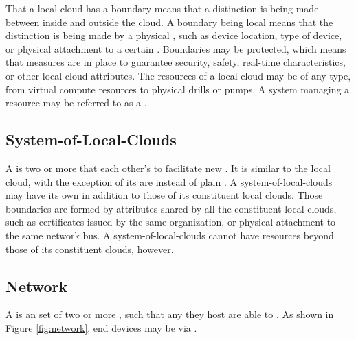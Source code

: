 That a local cloud has a boundary means that a distinction is being made between  inside and outside the cloud.
A boundary being local means that the distinction is being made by a physical , such as device location, type of device, or physical attachment to a certain .
Boundaries may be protected, which means that measures are in place to guarantee security, safety, real-time characteristics, or other local cloud attributes.
The resources of a local cloud may be of any type, from virtual compute resources to physical drills or pumps.
A system managing a resource may be referred to as a .

\subsection{System-of-Local-Clouds}
\label{sec:concepts:solc}

A  is two or more  that  each other's  to facilitate new .
It is similar to the local cloud, with the exception of its  are  instead of plain .
A system-of-local-clouds may have its own  in addition to those of its constituent local clouds.
Those boundaries are formed by attributes shared by all the constituent local clouds, such as certificates issued by the same organization, or physical attachment to the same network bus.
A system-of-local-clouds cannot have resources beyond those of its constituent clouds, however.

\subsection{Network}
\label{sec:concepts:network}

A  is an  set of two or more ,  such that any  they host are able to .
As shown in Figure \ref{fig:network}, end devices may be  via .

